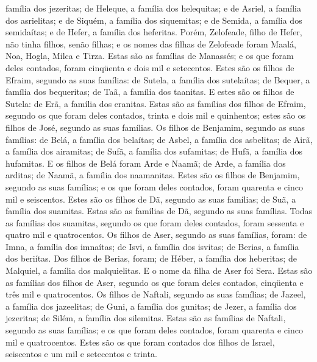 família dos jezeritas; de Heleque, a família dos helequitas;
e de Asriel, a família dos asrielitas; e de Siquém, a família
dos siquemitas; e de Semida, a família dos semidaítas; e de
Hefer, a família dos heferitas. Porém, Zelofeade, filho de
Hefer, não tinha filhos, senão filhas; e os nomes das filhas de
Zelofeade foram Maalá, Noa, Hogla, Milca e Tirza. Estas são
as famílias de Manassés; e os que foram deles contados, foram
cinqüenta e dois mil e setecentos. Estes são os filhos de
Efraim, segundo as suas famílias: de Sutela, a família dos
sutelaítas; de Bequer, a família dos bequeritas; de Taã, a família
dos taanitas. E estes são os filhos de Sutela: de Erã, a
família dos eranitas. Estas são as famílias dos filhos de
Efraim, segundo os que foram deles contados, trinta e dois mil e
quinhentos; estes são os filhos de José, segundo as suas famílias.
Os filhos de Benjamim, segundo as suas famílias: de Belá, a
família dos belaítas; de Asbel, a família dos asbelitas; de Airã, a
família dos airamitas; de Sufã, a família dos sufamitas; de
Hufã, a família dos hufamitas. E os filhos de Belá foram Arde
e Naamã; de Arde, a família dos arditas; de Naamã, a família dos
naamanitas. Estes são os filhos de Benjamim, segundo as suas
famílias; e os que foram deles contados, foram quarenta e cinco mil
e seiscentos. Estes são os filhos de Dã, segundo as suas
famílias; de Suã, a família dos suamitas. Estas são as famílias de
Dã, segundo as suas famílias. Todas as famílias dos suamitas,
segundo os que foram deles contados, foram sessenta e quatro mil e
quatrocentos. Os filhos de Aser, segundo as suas famílias,
foram: de Imna, a família dos imnaítas; de Isvi, a família dos
isvitas; de Berias, a família dos beriítas. Dos filhos de
Berias, foram; de Héber, a família dos heberitas; de Malquiel, a
família dos malquielitas. E o nome da filha de Aser foi Sera.
Estas são as famílias dos filhos de Aser, segundo os que
foram deles contados, cinqüenta e três mil e quatrocentos. Os
filhos de Naftali, segundo as suas famílias; de Jazeel, a família
dos jazeelitas; de Guni, a família dos gunitas; de Jezer, a
família dos jezeritas; de Silém, a família dos silemitas. Estas
são as famílias de Naftali, segundo as suas famílias; e os que foram
deles contados, foram quarenta e cinco mil e quatrocentos. 
Estes são os que foram contados dos filhos de Israel, seiscentos e
um mil e setecentos e trinta.

